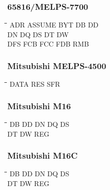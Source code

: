 \subsubsection{65816/MELPS-7700}
{\tt\begin{tabbing}
\hspace{3cm}\=\hspace{3cm}\=\hspace{3cm}\=\hspace{3cm}\=\kill
ADR        \> ASSUME      \> BYT         \> DB          \> DD \\
DN         \> DQ          \> DS          \> DT          \> DW \\
DFS        \> FCB         \> FCC         \> FDB         \> RMB \\
\end{tabbing}}

\subsubsection{Mitsubishi MELPS-4500}
{\tt\begin{tabbing}
\hspace{3cm}\=\hspace{3cm}\=\hspace{3cm}\=\hspace{3cm}\=\kill
DATA       \> RES         \> SFR \\
\end{tabbing}}

\subsubsection{Mitsubishi M16}
{\tt\begin{tabbing}
\hspace{3cm}\=\hspace{3cm}\=\hspace{3cm}\=\hspace{3cm}\=\kill
DB         \> DD          \> DN          \> DQ          \> DS \\
DT         \> DW          \> REG \\
\end{tabbing}}

\subsubsection{Mitsubishi M16C}
{\tt\begin{tabbing}
\hspace{3cm}\=\hspace{3cm}\=\hspace{3cm}\=\hspace{3cm}\=\kill
DB         \> DD          \> DN          \> DQ          \> DS \\
DT         \> DW          \> REG \\
\end{tabbing}}

